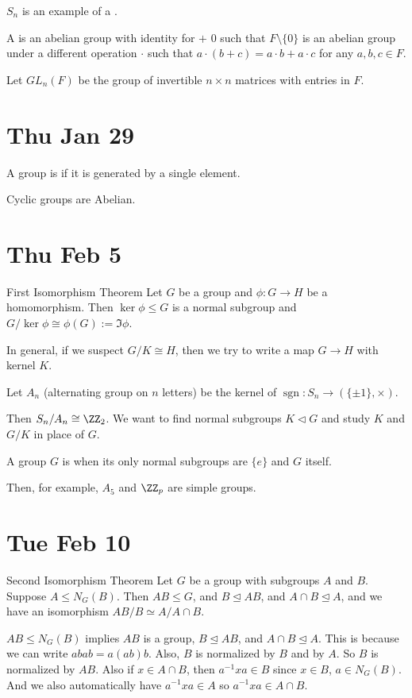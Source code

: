 \documentclass{article}
\DeclareMathOperator{\sgn}{sgn}
\begin{document}
$S_n$ is an example of a .
\begin{definition}
  A  is an abelian group with identity for $+$ $0$ such that $F \setminus \{0\}$ is an abelian group under a different operation $\cdot$ such that $a \cdot (b+c) = a\cdot b + a\cdot c$ for any $a,b,c \in F$.
\end{definition}
\begin{definition}
  Let $GL_n (F)$ be the group of invertible $n \times n$ matrices with entries in $F$.
\end{definition}

\section{Thu Jan 29}
\begin{definition}
  A group is  if it is generated by a single element.
\end{definition}
Cyclic groups are Abelian.

\section{Thu Feb 5}
\begin{theorem}{First Isomorphism Theorem}{}
Let $G$ be a group and $\phi: G \to H$ be a homomorphism. 
Then $\ker \phi \leq G$ is a normal subgroup and $G / \ker \phi \cong \phi(G) := \Im \phi$.
\end{theorem}
In general, if we suspect $G / K \cong H$, then we try to write a map $G \to H$ with kernel $K$.
\begin{definition}
  Let $A_n$ (alternating group on $n$ letters) be the kernel of $\sgn: S_n \to (\{\pm 1\}, \times)$.
\end{definition}
Then $S_n / A_n \cong \ZZ_2$. 
We want to find normal subgroups $K \triangleleft G$ and study $K$ and $G/K$ in place of $G$.
\begin{definition}
  A group $G$ is  when its only normal subgroups are $\{e\}$ and $G$ itself.
\end{definition}
Then, for example, $A_5$ and $\ZZ_p$ are simple groups.


\section{Tue Feb 10}
\begin{theorem}{Second Isomorphism Theorem}{}
Let $G$ be a group with subgroups $A$ and $B$. Suppose $A \leq N_G(B)$. Then $AB \leq G$, and $B \trianglelefteq AB$, and $A \cap B \trianglelefteq A$, and we have an isomorphism $AB/B \simeq A / A \cap B$. 
\end{theorem}
\proof $AB \leq N_G(B)$ implies $AB$ is a group, $B \trianglelefteq AB$, and $A \cap B \trianglelefteq A$. This is because we can write $abab = a(ab)b$. Also, $B$ is normalized by $B$ and by $A$. So $B$ is normalized by $AB$. Also if $x \in A \cap B$, then $a^{-1}xa \in B$ since $x\in B$, $a \in N_G(B)$. And we also automatically have $a^{-1}xa \in A$ so $a^{-1}xa \in A \cap B$.
\end{document}
